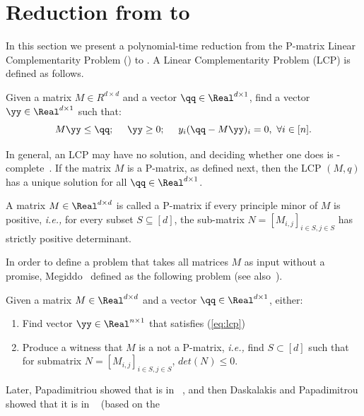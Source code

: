 
\section{Reduction from \PLCP to \EOPL}
\label{sec:PLCPtoEOPL}

In this section we present a polynomial-time reduction from the P-matrix Linear
Complementarity Problem (\PLCP) to \EOPL.
A Linear Complementarity Problem (LCP) is defined as follows.

\begin{definition}[LCP]
\label{def:lcp}
Given a matrix $M \in R^{d \times d}$ and a vector $\qq\in \Real^{d\times 1}$,
find a vector~{$\yy\in \Real^{d \times 1}$} such that:
\begin{equation}\label{eq:lcp}
M\yy\le \qq;\ \ \ \ \yy\ge 0;\ \ \ \ y_i(\qq - M\yy)_i =0,\ \forall i \in [n].
\end{equation}
\end{definition}
%
In general, an LCP may have no solution, and deciding whether one does is
\NP-complete~\cite{chung1989np}. If the matrix $M$ is a P-matrix, as defined
next, then the LCP $(M,q)$ has a unique solution for all $\qq\in \Real^{d\times
1}$.
%
\begin{definition}[P-matrix]
\label{def:Pmatrix}
A matrix $M \in \Real^{d \times d}$ is called a P-matrix if every principle
minor of $M$ is positive, {\em i.e.,} for every subset $S\subseteq[d]$, the
sub-matrix $N=[M_{i,j}]_{i\in S, j\in S}$ has strictly positive determinant. 
\end{definition}
%
In order to define a problem that takes all matrices $M$ as input without 
a promise, Megiddo~\cite{megiddo1988note} defined \PLCP as the following problem
(see also~\cite{megiddo1991total}).
%
\begin{definition}[\PLCP] \label{def:plcp} Given a matrix $M\in \Real^{d\times
d}$ and a vector $\qq\in \Real^{d\times 1}$, either:
\begin{enumerate}[label=(PLCP\arabic*)] \item Find vector $\yy \in \Real^{n
			\times 1}$ that satisfies (\ref{eq:lcp}) \item Produce a witness
that $M$ is a not a P-matrix, {\em i.e.,} find $S\subset [d]$ such that for
submatrix $N=[M_{i,j}]_{i\in S, j\in S}$, $det(N)\le 0$.  \end{enumerate}
\end{definition}
%
Later, Papadimitriou showed that \PLCP is in
\PPAD~\cite{papadimitriou1994complexity}, and then Daskalakis and Papadimitrou
showed that it is in \CLS~\cite{daskalakis2011continuous} (based on the
